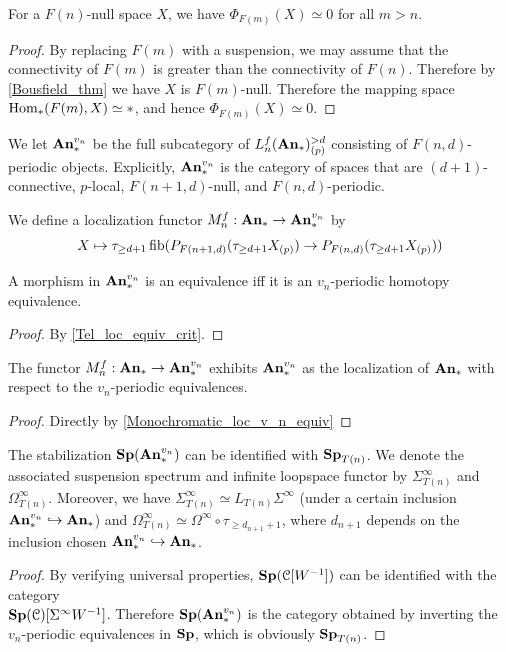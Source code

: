 	\begin{lemma}\label{Pre_Bousfield_Kuhn_vanish_crit}
		For a $F(n)$-null space $X$, we have $\Phi_{F(m)}(X)\simeq0$ for all $m>n$. 
	\end{lemma}
	\begin{proof}
		By replacing $F(m)$ with a suspension, we may assume that the connectivity of $F(m)$ is greater than the connectivity of $F(n)$. Therefore by \cref{Bousfield_thm} we have $X$ is $F(m)$-null. Therefore the mapping space $\operatorname{\mathrm{Hom}}_*(F(m),X)\simeq*$, and hence $\Phi_{F(m)}(X)\simeq0$. 
	\end{proof}

	\begin{defn}\label{Monochromatic_loc}
		We let $\mathbf{An}_*^{v_n}$ be the full subcategory of $L_n^f(\mathbf{An}_*)_{(p)}^{>d}$ consisting of $F(n,d)$-periodic objects. Explicitly, $\mathbf{An}_*^{v_n}$ is the category of spaces that are $(d+1)$-connective, $p$-local, $F(n+1,d)$-null, and $F(n,d)$-periodic. 

		We define a localization functor $M_n^f:\mathbf{An}_*\to\mathbf{An}_*^{v_n}$ by 
		\[ X\mapsto\tau_{\geq d+1}\operatorname{\mathrm{fib}}(P_{F(n+1,d)}(\tau_{\geq d+1}X_{(p)})\to P_{F(n,d)}(\tau_{\geq d+1}X_{(p)})) \]
	\end{defn}

	\begin{coro}\label{Monochromatic_loc_v_n_equiv}
		A morphism in $\mathbf{An}_*^{v_n}$ is an equivalence iff it is an $v_n$-periodic homotopy equivalence. 
	\end{coro}
	\begin{proof}
		By \cref{Tel_loc_equiv_crit}. 
	\end{proof}

	\begin{coro}\label{Monochromatic_loc_equiv_maps}
		The functor $M_n^f:\mathbf{An}_*\to\mathbf{An}_*^{v_n}$ exhibits $\mathbf{An}_*^{v_n}$ as the localization of $\mathbf{An}_*$ with respect to the $v_n$-periodic equivalences. 
	\end{coro}
	\begin{proof}
		Directly by \cref{Monochromatic_loc_v_n_equiv}
	\end{proof}

	\begin{coro}\label{Tel_susp_loop}
		The stabilization $\mathbf{Sp}(\mathbf{An}_*^{v_n})$ can be identified with $\mathbf{Sp}_{T(n)}$. We denote the associated suspension spectrum and infinite loopspace functor by $\Sigma^\infty_{T(n)}$ and $\Omega^\infty_{T(n)}$. Moreover, we have $\Sigma^\infty_{T(n)}\simeq L_{T(n)}\Sigma^\infty$ (under a certain inclusion $\mathbf{An}_*^{v_n}\hookrightarrow\mathbf{An}_*$) and $\Omega^\infty_{T(n)}\simeq\Omega^\infty\circ\tau_{\geq d_{n+1}+1}$, where $d_{n+1}$ depends on the inclusion chosen $\mathbf{An}_*^{v_n}\hookrightarrow\mathbf{An}_*$. 
	\end{coro}
	\begin{proof}
		By verifying universal properties, $\mathbf{Sp}(\mathcal{C}[W^{-1}])$ can be identified with the category \\
		$\mathbf{Sp}(\mathcal{C})[\Sigma^\infty W^{-1}]$. Therefore $\mathbf{Sp}(\mathbf{An}_*^{v_n})$ is the category obtained by inverting the $v_n$-periodic equivalences in $\mathbf{Sp}$, which is obviously $\mathbf{Sp}_{T(n)}$. 
	\end{proof}

